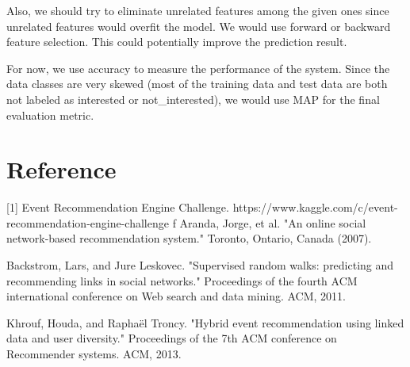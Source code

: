 \documentclass{article}
\begin{document}
Also, we should try to eliminate unrelated features among the given ones since unrelated features would overfit the model. We would use forward or backward feature selection. This could potentially improve the prediction result.

For now, we use accuracy to measure the performance of the system. Since the data classes are very skewed (most of the training data and test data are both not labeled as interested or not\_interested), we would use MAP for the final evaluation metric.

\section{Reference}
[1] Event Recommendation Engine Challenge.
https://www.kaggle.com/c/event-recommendation-engine-challenge
f
\noindent[2] Aranda, Jorge, et al. "An online social network-based recommendation system." Toronto, Ontario, Canada (2007).

\noindent[3] Backstrom, Lars, and Jure Leskovec. "Supervised random walks: predicting and recommending links in social networks." Proceedings of the fourth ACM international conference on Web search and data mining. ACM, 2011.

\noindent[4] Khrouf, Houda, and Raphaël Troncy. "Hybrid event recommendation using linked data and user diversity." Proceedings of the 7th ACM conference on Recommender systems. ACM, 2013.





\end{document}
